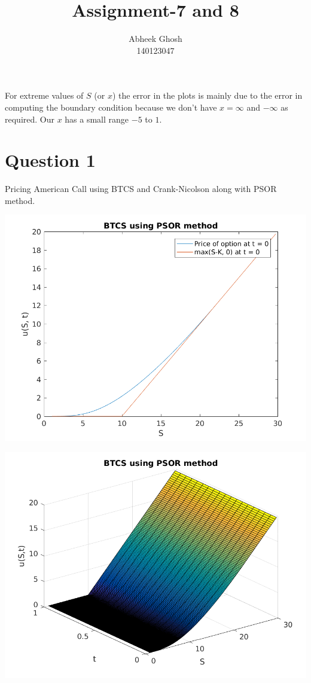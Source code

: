 \documentclass{article}
\begin{document}
	\title{\textbf{Assignment-7 and 8}}
	\author{Abheek Ghosh \\ 
		140123047 }
	
	\maketitle
	
For extreme values of $S$ (or $x$) the error in the plots is mainly due to the error in computing the boundary condition because we don't have $x = \infty$ and $-\infty$ as required. Our $x$ has a small range $-5$ to $1$.

\section{Question 1}
Pricing American Call using BTCS and Crank-Nicolson along with PSOR method.

\includegraphics{"q1_1"}
\pagebreak


\includegraphics{"q1_2"}
\pagebreak
\end{document}
